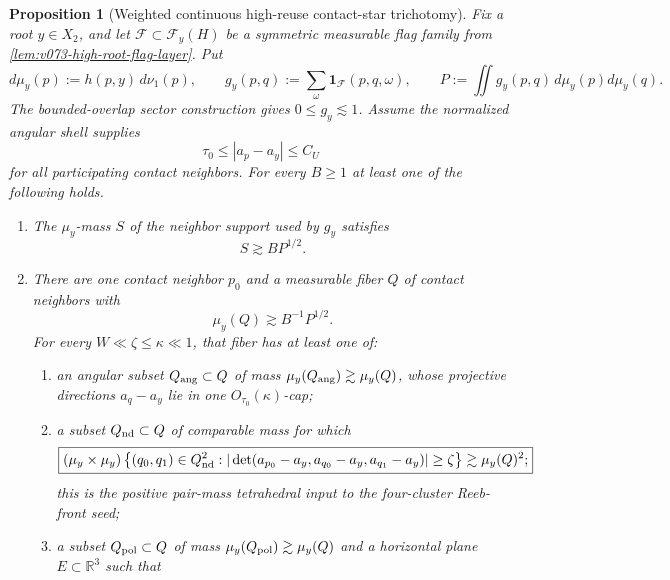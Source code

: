 \documentclass[10pt]{article}
\newtheorem{proposition}[theorem]{Proposition}
\begin{document}
\begin{proposition}[Weighted continuous high-reuse contact-star trichotomy]
\label{prop:v074-continuous-high-reuse-trichotomy}
Fix a root \(y\in X_2\), and let
\(\mathscr F\subset\mathscr F_y(H)\) be a symmetric measurable flag family from
\cref{lem:v073-high-root-flag-layer}.  Put
\[
d\mu_y(p):=h(p,y)\,d\nu_1(p),
\qquad
g_y(p,q):=
\sum_\omega\mathbf 1_{\mathscr F}(p,q,\omega),
\qquad
P:=\iint g_y(p,q)\,d\mu_y(p)d\mu_y(q).
\]
The bounded-overlap sector construction gives \(0\le g_y\lesssim1\).  Assume the normalized
angular shell supplies
\[
\tau_0\le |a_p-a_y|\le C_U
\]
for all participating contact neighbors.  For every \(B\ge1\) at least one of the following holds.
\begin{enumerate}[label=\textnormal{(\roman*)}]
\item The \(\mu_y\)-mass \(S\) of the neighbor support used by \(g_y\) satisfies
  \begin{equation}
  \label{eq:v074-amplified-neighbor-support}
  \boxed{S\gtrsim BP^{1/2}.}
  \end{equation}
\item There are one contact neighbor \(p_0\) and a measurable fiber \(Q\) of contact neighbors with
  \begin{equation}
  \label{eq:v074-large-anchor-fiber}
  \boxed{\mu_y(Q)\gtrsim B^{-1}P^{1/2}.}
  \end{equation}
  For every \(W\ll\zeta\le\kappa\ll1\), that fiber has at least one of:
  \begin{enumerate}[label=\textnormal{(\alph*)}]
  \item an angular subset \(Q_{\rm ang}\subset Q\) of mass
    \(\mu_y(Q_{\rm ang})\gtrsim\mu_y(Q)\), whose projective directions
    \(a_q-a_y\) lie in one \(O_{\tau_0}(\kappa)\)-cap;
  \item a subset \(Q_{\rm nd}\subset Q\) of comparable mass for which
    \begin{equation}
    \label{eq:v074-nondegenerate-substar-pairs}
    \boxed{
    (\mu_y\times\mu_y)
    \left\{
    (q_0,q_1)\in Q_{\rm nd}^2:
    |\det(a_{p_0}-a_y,a_{q_0}-a_y,a_{q_1}-a_y)|
    \ge\zeta
    \right\}
    \gtrsim\mu_y(Q)^2;
    }
    \end{equation}
    this is the positive pair-mass tetrahedral input to the four-cluster Reeb-front seed;
  \item a subset \(Q_{\rm pol}\subset Q\) of mass
    \(\mu_y(Q_{\rm pol})\gtrsim\mu_y(Q)\) and a horizontal plane
    \(E\subset\mathbb R^3\) such that
    \begin{equation}

\end{equation}
\end{enumerate}
\end{enumerate}
\end{proposition}
\end{document}
